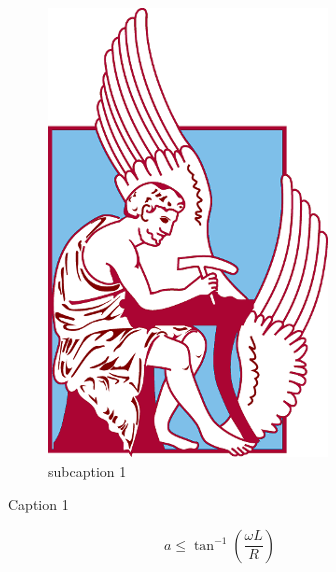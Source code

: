 \begin{figure}[h]
\begin{subfigure}{.5\textwidth}
		\includegraphics[width=\textwidth]{Images/university.png}
		\caption{subcaption 1}
		\label{circ:1_phase_Th}
	\end{subfigure}
	\caption{Caption 1}
\end{figure}

\begin{equation}
	a \leq \tan^{-1} \left(\frac{\omega L}{R} \right) \label{eq:Q11_V_o}
\end{equation}
